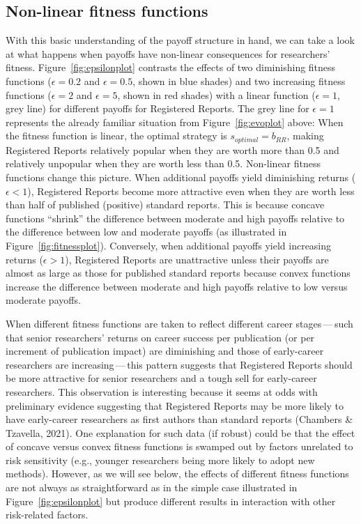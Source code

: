 \documentclass[british,,man,mask,floatsintext]{apa6}
\begin{document}
\hypertarget{non-linear-fitness-functions-1}{%
\subsection{Non-linear fitness functions}\label{non-linear-fitness-functions-1}}

With this basic understanding of the payoff structure in hand, we can take a look at what happens when payoffs have non-linear consequences for researchers' fitness.
Figure~\ref{fig:epsilonplot} contrasts the effects of two diminishing fitness functions (\(\epsilon = 0.2\) and \(\epsilon = 0.5\), shown in blue shades) and two increasing fitness functions (\(\epsilon = 2\) and \(\epsilon = 5\), shown in red shades) with a linear function (\(\epsilon = 1\), grey line) for different payoffs for Registered Reports.
The grey line for \(\epsilon = 1\) represents the already familiar situation from Figure~\ref{fig:evoplot} above:
When the fitness function is linear, the optimal strategy is \(s_{optimal} = b_{RR}\), making Registered Reports relatively popular when they are worth more than 0.5 and relatively unpopular when they are worth less than 0.5.
Non-linear fitness functions change this picture.
When additional payoffs yield diminishing returns (\(\epsilon <1\)), Registered Reports become more attractive even when they are worth less than half of published (positive) standard reports.
This is because concave functions \enquote{shrink} the difference between moderate and high payoffs relative to the difference between low and moderate payoffs (as illustrated in Figure~\ref{fig:fitnessplot}).
Conversely, when additional payoffs yield increasing returns (\(\epsilon > 1\)), Registered Reports are unattractive unless their payoffs are almost as large as those for published standard reports because convex functions increase the difference between moderate and high payoffs relative to low versus moderate payoffs.

When different fitness functions are taken to reflect different career stages\(\,\)---\(\,\)such that senior researchers' returns on career success per publication (or per increment of publication impact) are diminishing and those of early-career researchers are increasing\(\,\)---\(\,\)this pattern suggests that Registered Reports should be more attractive for senior researchers and a tough sell for early-career researchers.
This observation is interesting because it seems at odds with preliminary evidence suggesting that Registered Reports may be more likely to have early-career researchers as first authors than standard reports (Chambers \& Tzavella, 2021).
One explanation for such data (if robust) could be that the effect of concave versus convex fitness functions is swamped out by factors unrelated to risk sensitivity (e.g., younger researchers being more likely to adopt new methods).
However, as we will see below, the effects of different fitness functions are not always as straightforward as in the simple case illustrated in Figure~\ref{fig:epsilonplot} but produce different results in interaction with other risk-related factors.
\end{document}

